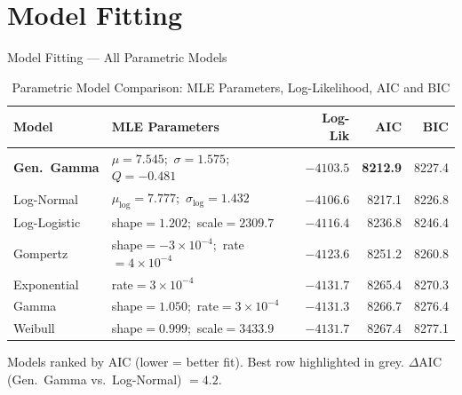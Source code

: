 \documentclass[aspectratio=169, 11pt]{beamer}
\begin{document}
\section{Model Fitting}
\begin{frame}{Model Fitting --- All Parametric Models}

  \vspace{4pt}
  \begin{table}
    \caption{Parametric Model Comparison: MLE Parameters, Log-Likelihood, AIC and BIC}
    \centering
    \small
    \begin{tabular}{@{}llrrr@{}}
      \toprule
      \textbf{Model} & \textbf{MLE Parameters}
        & \textbf{Log-Lik} & \textbf{AIC} & \textbf{BIC} \\
      \midrule
      \rowcolor{gray!12}
      \textbf{Gen.\ Gamma}
        & $\mu=7.545$;\ $\sigma=1.575$;\ $Q=-0.481$
        & $-4103.5$ & \textbf{8212.9} & 8227.4 \\
      Log-Normal
        & $\mu_{\log}=7.777$;\ $\sigma_{\log}=1.432$
        & $-4106.6$ & 8217.1 & 8226.8 \\
      Log-Logistic
        & shape$=1.202$;\ scale$=2309.7$
        & $-4116.4$ & 8236.8 & 8246.4 \\
      Gompertz
        & shape$=-3{\times}10^{-4}$;\ rate$=4{\times}10^{-4}$
        & $-4123.6$ & 8251.2 & 8260.8 \\
      Exponential
        & rate$=3{\times}10^{-4}$
        & $-4131.7$ & 8265.4 & 8270.3 \\
      Gamma
        & shape$=1.050$;\ rate$=3{\times}10^{-4}$
        & $-4131.3$ & 8266.7 & 8276.4 \\
      Weibull
        & shape$=0.999$;\ scale$=3433.9$
        & $-4131.7$ & 8267.4 & 8277.1 \\
      \bottomrule
    \end{tabular}
  \end{table}

  \vspace{4pt}
  \footnotesize
  Models ranked by AIC (lower = better fit).
  Best row highlighted in grey.
  $\Delta$AIC (Gen.\ Gamma vs.\ Log-Normal) $= 4.2$.

\end{frame}

\end{document}
